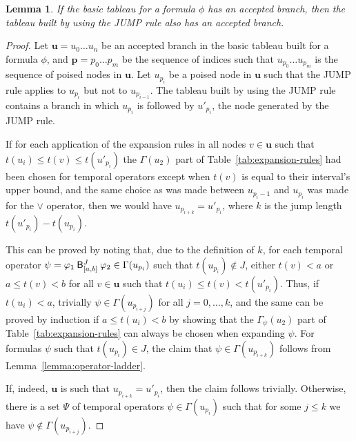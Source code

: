 \documentclass[acmsmall,screen]{acmart}
\newtheorem{lemma}{Lemma}
\begin{document}
\begin{lemma}
\label{lemma:jump-complete}
If the basic tableau for a formula $\phi$ has an accepted branch,
then the tableau built by using the \textsf{JUMP} rule also has an accepted branch.
\end{lemma}
\begin{proof}
Let $\mathbf{u} = u_0 \dots u_n$ be an accepted branch in the basic tableau built for a formula $\phi$,
and $\textbf{p} = p_0 \dots p_m$ be the sequence of indices
such that $u_{p_0} \dots u_{p_m}$ is the sequence of poised nodes in $\mathbf{u}$.
Let $u_{p_i}$ be a poised node in $\mathbf{u}$ such that the \textsf{JUMP} rule applies to $u_{p_i}$ but not to $u_{p_{i-1}}$.
The tableau built by using the \textsf{JUMP} rule contains a branch in which $u_{p_i}$ is followed by $u'_{p_i}$,
the node generated by the \textsf{JUMP} rule.

If for each application of the expansion rules in all nodes $v \in \mathbf{u}$ such that $t(u_i) \leq t(v) \leq t(u'_{p_i})$
the $\Gamma(u_2)$ part of Table~\ref{tab:expansion-rules} had been chosen for temporal operators
except when $t(v)$ is equal to their interval's upper bound,
and the same choice as was made between $u_{p_i-1}$ and $u_{p_i}$ was made for the $\lor$ operator,
then we would have $u_{p_{i+k}} = u'_{p_i}$, where $k$ is the jump length $t(u'_{p_i}) - t(u_{p_i})$.

This can be proved by noting that, due to the definition of $k$,
for each temporal operator $\psi = \anybinop[J]{[a,b]}{\varphi_1}{\varphi_2} \in \Gamma(u_{p_i})$
such that $t(u_{p_i}) \not\in J$, either $t(v) < a$ or $a \leq t(v) < b$
for all $v \in \mathbf{u}$ such that $t(u_i) \leq t(v) < t(u'_{p_i})$.
Thus, if $t(u_i) < a$, trivially $\psi \in \Gamma(u_{p_{i+j}})$ for all $j = 0, \dots, k$,
and the same can be proved by induction if $a \leq t(u_i) < b$ by showing
that the $\Gamma_\psi(u_2)$ part of Table~\ref{tab:expansion-rules} can always be chosen when expanding $\psi$.
For formulas $\psi$ such that $t(u_{p_i}) \in J$,
the claim that $\psi \in \Gamma(u_{p_{i+k}})$ follows from Lemma~\ref{lemma:operator-ladder}.

If, indeed, $\mathbf{u}$ is such that $u_{p_{i+k}} = u'_{p_i}$, then the claim follows trivially.
Otherwise, there is a set $\Psi$ of temporal operators $\psi \in \Gamma(u_{p_i})$
such that for some $j \leq k$ we have $\psi \not\in \Gamma(u_{p_{i+j}})$.


\end{proof}
\end{document}
